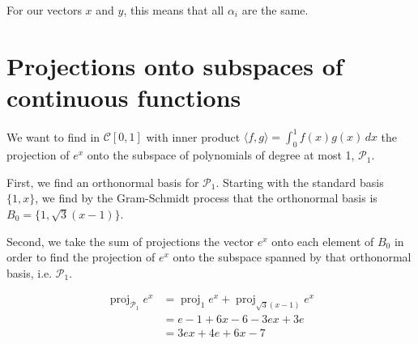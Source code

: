\documentclass{article}
\DeclareMathOperator{\proj}{proj}
\begin{document}
For our vectors $x$ and $y$, this means that all $\alpha_i$ are the same.


\section{Projections onto subspaces of continuous functions}

We want to find in $\mathcal{C}[0, 1]$ with inner product
$\langle f, g \rangle = \int_0^1 f(x)g(x)\, dx$ the projection of $e^x$ onto
the subspace of polynomials of degree at most 1, $\mathcal{P}_1$.

First, we find an orthonormal basis for $\mathcal{P}_1$.
Starting with the standard basis $\{1, x\}$, we find by the
Gram-Schmidt process that the orthonormal basis is
$B_0 = \{1, \sqrt{3}(x - 1)\}$.

Second, we take the sum of projections the vector $e^x$ onto each element of
$B_0$ in order to find the projection of $e^x$ onto the
subspace spanned by that orthonormal basis, i.e. $\mathcal{P}_1$.

\begin{align*}
    \proj_{\mathcal{P}_1} {e^x} &= \proj_{1} {e^x} + \proj_{\sqrt{3} (x - 1)} {e^x} \\
                                &= e - 1 + 6 x - 6 - 3 e x + 3 e \\
                                &= 3 e x + 4 e + 6 x - 7
\end{align*}
\end{document}
